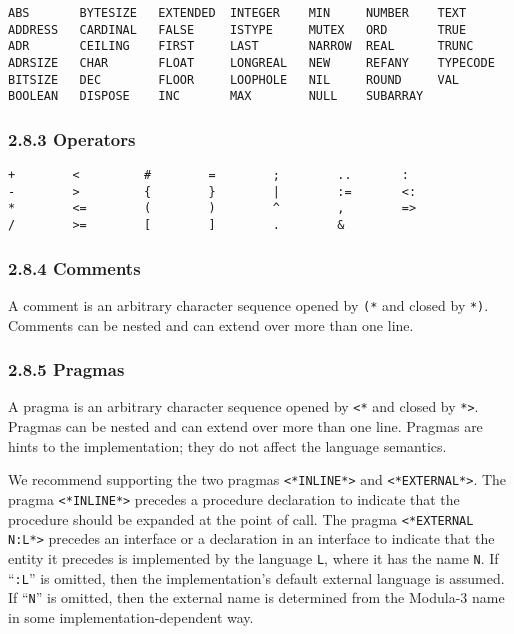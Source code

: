 \documentclass[10pt]{article}
\begin{document}
\begin{verbatim}
ABS       BYTESIZE   EXTENDED  INTEGER    MIN     NUMBER    TEXT
ADDRESS   CARDINAL   FALSE     ISTYPE     MUTEX   ORD       TRUE
ADR       CEILING    FIRST     LAST       NARROW  REAL      TRUNC
ADRSIZE   CHAR       FLOAT     LONGREAL   NEW     REFANY    TYPECODE
BITSIZE   DEC        FLOOR     LOOPHOLE   NIL     ROUND     VAL
BOOLEAN   DISPOSE    INC       MAX        NULL    SUBARRAY
\end{verbatim}

\subsubsection*{2.8.3 Operators}

\begin{verbatim}
+        <         #        =        ;        ..       :
-        >         {        }        |        :=       <:
*        <=        (        )        ^        ,        =>
/        >=        [        ]        .        &
\end{verbatim}

\subsubsection*{2.8.4 Comments}

A comment is an arbitrary character sequence opened by \verb|(*| and closed by
\verb|*)|.  Comments can be nested and can extend over more than one line.

\subsubsection*{2.8.5 Pragmas}

A pragma is an arbitrary character sequence opened by \verb|<*| and closed by
\verb|*>|.  Pragmas can be nested and can extend over more than one line.
Pragmas are hints to the implementation; they do not affect the language
semantics.

We recommend supporting the two pragmas \verb|<*INLINE*>| and
\verb|<*EXTERNAL*>|.  The pragma \verb|<*INLINE*>| precedes a procedure
declaration to indicate that the procedure should be expanded at the point of
call.  The pragma \verb|<*EXTERNAL N:L*>| precedes an interface or a
declaration in an interface to indicate that the entity it precedes is
implemented by the language \verb|L|, where it has the name \verb|N|.  If
``\verb|:L|'' is omitted, then the implementation's default external language
is assumed.  If ``\verb|N|'' is omitted, then the external name is determined
from the Modula-3 name in some implementation-dependent way.
\end{document}
